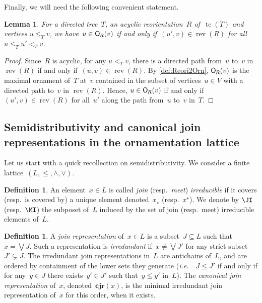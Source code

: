 \documentclass{amsart}
\newtheorem{lemma}[theorem]{Lemma}
\theoremstyle{definition}
\newtheorem{definition}[theorem]{Definition}
\DeclareMathOperator{\tc}{tc} %
\newcommand{\ie}{\textit{i.e.}~} %
\newcommand{\darkblue}{\color{darkblue}} %
\newcommand{\defn}[1]{\textsl{\darkblue #1}} %
\newcommand{\meet}{\wedge} %
\newcommand{\join}{\vee} %
\newcommand{\bigJoin}{\bigvee} %
\newcommand{\CJR}{\mathbf{cjr}} %
\newcommand{\mymap}[2]{\mathsf{#1}_{\hspace{-.7pt}#2}}
\newcommand{\orn}[1]{\mymap{O}{#1}}  %
\DeclareMathOperator{\rev}{rev} %
\begin{document}
Finally, we will need the following convenient statement.

\begin{lemma}
\label{lem:Reori2OrnT}
For a directed tree~$T$, an acyclic reorientation~$R$ of~$\tc(T)$ and vertices $u \le_T v$, we have~$u \in \orn{R}(v)$ if and only if~$(u',v) \in \rev(R)$ for all~$u \le_T u' <_T v$.
\end{lemma}

\begin{proof}
Since~$R$ is acyclic, for any $u <_T v$, there is a directed path from~$u$ to~$v$ in~$\rev(R)$ if and only if~$(u,v) \in \rev(R)$.
By \cref{def:Reori2Orn}, $\orn{R}(v)$ is the maximal ornament of~$T$ at~$v$ contained in the subset of vertices~$u \in V$ with a directed path to~$v$ in $\rev(R)$.
Hence, $u \in \orn{R}(v)$ if and only if~$(u',v) \in \rev(R)$ for all~$u'$ along the path from~$u$ to~$v$ in~$T$.
\end{proof}


\subsection{Semidistributivity and canonical join representations in the ornamentation lattice}
\label{subsec:semidistributivityT}

Let us start with a quick recollection on semidistributivity.
We consider a finite lattice~$(L, \le, \meet, \join)$.

\begin{definition}
An element~$x \in L$ is called \defn{join} (resp.~\defn{meet}) \defn{irreducible} if it covers (resp.~is covered by) a unique element denoted~$x_\star$ (resp.~$x^\star$).
We denote by $\JI$ (resp.~$\MI$) the subposet of~$L$ induced by the set of join (resp.~meet) irreducible elements of~$L$.
\end{definition}

\begin{definition}
A \defn{join representation} of~$x \in L$ is a subset~${J \subseteq L}$ such that~$x = \bigJoin J$.
Such a representation is \defn{irredundant} if~$x \ne \bigJoin J'$ for any strict subset~$J' \subsetneq J$.
The irredundant join representations in~$L$ are antichains of~$L$, and are ordered by containment of the lower sets they generate (\ie~$J \le J'$ if and only if for any~$y \in J$ there exists~$y' \in J'$ such that~$y \le y'$ in~$L$).
The \defn{canonical join representation} of~$x$, denoted~$\CJR(x)$, is the minimal irredundant join representation of~$x$ for this order, when it exists.
\end{definition}
\end{document}
